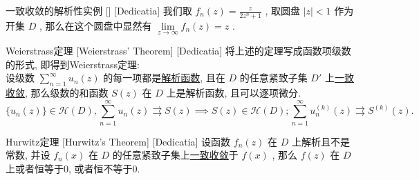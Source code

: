 \documentclass[UTF8]{ctexart}
\newcommand{\AnalyticalFunction}{\hyperref[dfn:AnalyticalFunction]{解析函数}}
\newcommand{\UniformConvergence}{\hyperref[dfn:UniformConvergence]{一致收敛}}
\begin{document}
\begin{xmp}
    [UUID]
    {一致收敛的解析性实例}
    []
    [Dedicatia]
    我们取 \( f_n(z)=\frac{z}{2z^n+1} \) , 取圆盘 \( |z|<1 \) 作为开集 \( D \) , 那么在这个圆盘中显然有 \( \lim\limits_{z\to\infty}f_n(z)=z \) .
\end{xmp}
\begin{thm}
    [UUID]
    {Weierstrass定理}
    [Weierstrass' Theorem]
    [Dedicatia]
    将上述的定理写成函数项级数的形式, 即得到Weierstrass定理: \\
    设级数 \( \sum_{n = 1}^{\infty} u_n(z) \) 的每一项都是\AnalyticalFunction , 且在 \( D \) 的任意紧致子集 \( D' \) 上\UniformConvergence , 那么级数的和函数 \( S(z) \) 在 \( D \) 上是解析函数, 且可以逐项微分. 
    \[\{u_n(z)\}\in\mathcal{H}(D),\sum_{n = 1}^{\infty} u_n(z)\rightrightarrows S(z)\implies S(z)\in\mathcal{H}(D); \sum_{n = 1}^{\infty} u_n^{(k)}(z)\rightrightarrows S^{(k)}(z).\]
\end{thm}
\begin{thm}
    [UUID]
    {Hurwitz定理}
    [Hurwitz's Theorem]
    [Dedicatia]
    设函数 \( f_n(z) \) 在 \( D \) 上解析且不是常数, 并设 \( f_n(x) \) 在 \( D \) 的任意紧致子集上\UniformConvergence 于 \( f(x) \) , 那么 \( f(z) \) 在 \( D \) 上或者恒等于0, 或者恒不等于0.
\end{thm}
\end{document}
